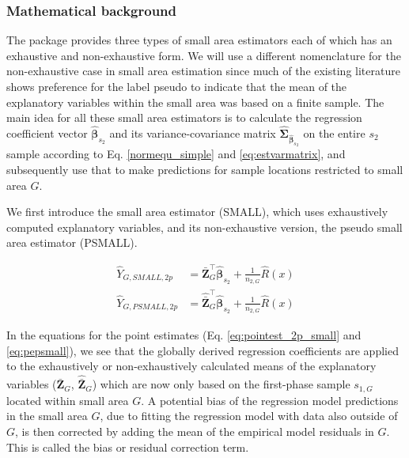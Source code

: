 \documentclass[article]{jss}
\begin{document}
\subsubsection{Mathematical background}

The  package provides three types of small area estimators each of which has an exhaustive and non-exhaustive form. We will use a different nomenclature for the non-exhaustive case in small area estimation since much of the existing literature shows preference for the label pseudo to indicate that the mean of the explanatory variables within the small area was based on a finite sample. The main idea for all these small area estimators is to calculate the regression coefficient vector $\hat{\pmb{\beta}}_{s_2}$ and its variance-covariance matrix $\hat{\pmb{\Sigma}}_{\hat{\pmb{\beta}}_{s_2}}$ on the entire $s_2$ sample according to Eq. \ref{normequ_simple} and \ref{eq:estvarmatrix}, and subsequently use that to make predictions for sample locations restricted to small area $G$.\par


We first introduce the small area estimator (SMALL), which uses exhaustively computed explanatory variables, and its non-exhaustive version, the pseudo small area estimator (PSMALL). 

\begin{subequations}\label{eq:pest_2p_small_psmall}
\begin{align}
  \hat{Y}_{G,SMALL,2p} & =\bar{\pmb{Z}}_G^{\top}\hat{\pmb{\beta}}_{s_2} + \frac{1}{n_{2,G}}\hat{R}(x)  \label{eq:pointest_2p_small} \\
  \hat{Y}_{G,PSMALL,2p} & =\hat{\bar{\pmb{Z}}}_G^{\top}\hat{\pmb{\beta}}_{s_2} + \frac{1}{n_{2,G}}\hat{R}(x) \label{eq:pepsmall}
\end{align}
\end{subequations}

In the equations for the point estimates (Eq. \ref{eq:pointest_2p_small} and \ref{eq:pepsmall}), we see that the globally derived regression coefficients are applied to the exhaustively or non-exhaustively calculated means of the explanatory variables ($\bar{\pmb{Z}}_G$, $\hat{\bar{\pmb{Z}}}_G$) which are now only based on the first-phase sample $s_{1,G}$ located within small area $G$. A potential bias of the regression model predictions in the small area $G$, due to fitting the regression model with data also outside of $G$, is then corrected by adding the mean of the empirical model residuals in $G$. This is called the bias or residual correction term.
\end{document}
